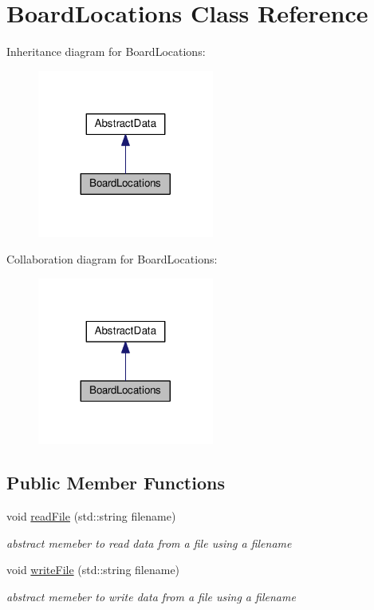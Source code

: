 \hypertarget{classBoardLocations}{}\section{Board\+Locations Class Reference}
\label{classBoardLocations}


Inheritance diagram for Board\+Locations\+:\nopagebreak
\begin{figure}[H]
\begin{center}
\leavevmode
\includegraphics[width=164pt]{classBoardLocations__inherit__graph}
\end{center}
\end{figure}


Collaboration diagram for Board\+Locations\+:\nopagebreak
\begin{figure}[H]
\begin{center}
\leavevmode
\includegraphics[width=164pt]{classBoardLocations__coll__graph}
\end{center}
\end{figure}
\subsection*{Public Member Functions}
\begin{DoxyCompactItemize}
\item 
void \hyperlink{classBoardLocations_aaf84c2db5212ae94ddece86c333befb8}{read\+File} (std\+::string filename)
\begin{DoxyCompactList}\small\item\em abstract memeber to read data from a file using a filename \end{DoxyCompactList}\item 
void \hyperlink{classBoardLocations_a9355491bd25943d2ad4f725fc8aae849}{write\+File} (std\+::string filename)
\begin{DoxyCompactList}\small\item\em abstract memeber to write data from a file using a filename \end{DoxyCompactList}\end{DoxyCompactItemize}
